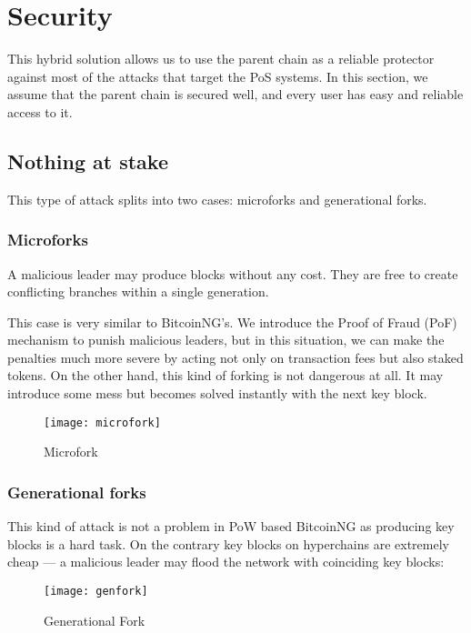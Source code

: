 \section{Security}

This hybrid solution allows us to use the parent chain as a
reliable protector against most of the attacks that target the PoS systems.
\cite{pos_attacks}
In this section, we assume that the parent chain is secured well, and every
user has easy and reliable access to it.

\subsection{Nothing at stake}

This type of attack splits into two cases: microforks and generational forks.

\subsubsection{Microforks}

A malicious leader may produce blocks without any cost.
They are free to create conflicting branches within a single generation.

This case is very similar to BitcoinNG's\cite{bcng}. We introduce the Proof of Fraud (PoF)
mechanism to punish malicious leaders, but in this situation, we can make
the penalties much more severe by acting not only on transaction fees
but also staked tokens. On the other hand, this kind of forking is not dangerous
at all. It may introduce some mess but becomes solved instantly with the next key block.

\begin{figure}[h]
	\caption{Microfork}
	\centering
	\texttt{[image: microfork]}
\end{figure}

\subsubsection{Generational forks}

This kind of attack is not a problem in PoW based BitcoinNG as producing
key blocks is a hard task. On the contrary key blocks on hyperchains are
extremely cheap — a malicious leader may flood the network with coinciding
key blocks:

\begin{figure}[h]
	\caption{Generational Fork}
	\centering
	\texttt{[image: genfork]}
\end{figure}

